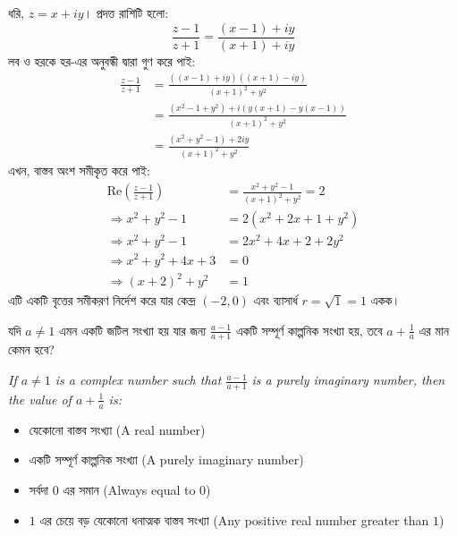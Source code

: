 \documentclass[12pt, a4paper]{article}
\begin{document}
\begin{tcolorbox}[solutionbox={সমাধান (Solution)}]
    \noindent
    ধরি, $z = x + iy$। প্রদত্ত রাশিটি হলো:
    \[ \frac{z-1}{z+1} = \frac{(x-1) + iy}{(x+1) + iy} \]
    লব ও হরকে হর-এর অনুবন্ধী দ্বারা গুণ করে পাই:
    \begin{align*}
        \frac{z-1}{z+1} &= \frac{((x-1) + iy)((x+1) - iy)}{(x+1)^2 + y^2} \\
        &= \frac{(x^2 - 1 + y^2) + i(y(x+1) - y(x-1))}{(x+1)^2 + y^2} \\
        &= \frac{(x^2 + y^2 - 1) + 2iy}{(x+1)^2 + y^2}
    \end{align*}
    এখন, বাস্তব অংশ সমীকৃত করে পাই:
    \begin{align*}
        \text{Re}\left(\frac{z-1}{z+1}\right) &= \frac{x^2 + y^2 - 1}{(x+1)^2 + y^2} = 2 \\
        \Rightarrow x^2 + y^2 - 1 &= 2(x^2 + 2x + 1 + y^2) \\
        \Rightarrow x^2 + y^2 - 1 &= 2x^2 + 4x + 2 + 2y^2 \\
        \Rightarrow x^2 + y^2 + 4x + 3 &= 0 \\
        \Rightarrow (x+2)^2 + y^2 &= 1
    \end{align*}
    এটি একটি বৃত্তের সমীকরণ নির্দেশ করে যার কেন্দ্র $(-2, 0)$ এবং ব্যাসার্ধ $r = \sqrt{1} = 1$ একক।
\end{tcolorbox}

\vspace{1em}

\begin{tcolorbox}[questionbox={প্রশ্ন (Question) 2}]
    \noindent
    যদি $a \neq 1$ এমন একটি জটিল সংখ্যা হয় যার জন্য $\frac{a-1}{a+1}$ একটি সম্পূর্ণ কাল্পনিক সংখ্যা হয়, তবে $a + \frac{1}{a}$ এর মান কেমন হবে?
    
    \vspace{0.8em}
    \begin{english}
    \noindent\textit{\color{darkgray}
    If $a \neq 1$ is a complex number such that $\frac{a-1}{a+1}$ is a purely imaginary number, then the value of $a + \frac{1}{a}$ is:
    }
    \end{english}
\end{tcolorbox}

\begin{itemize}[label={}, leftmargin=1cm, itemsep=0.5em]
    \item[\textbf{A)}] যেকোনো বাস্তব সংখ্যা (A real number)
    \item[\textbf{B)}] একটি সম্পূর্ণ কাল্পনিক সংখ্যা (A purely imaginary number)
    \item[\textbf{C)}] সর্বদা $0$ এর সমান (Always equal to $0$)
    \item[\textbf{D)}] $1$ এর চেয়ে বড় যেকোনো ধনাত্মক বাস্তব সংখ্যা (Any positive real number greater than $1$)
\end{itemize}
\end{document}
